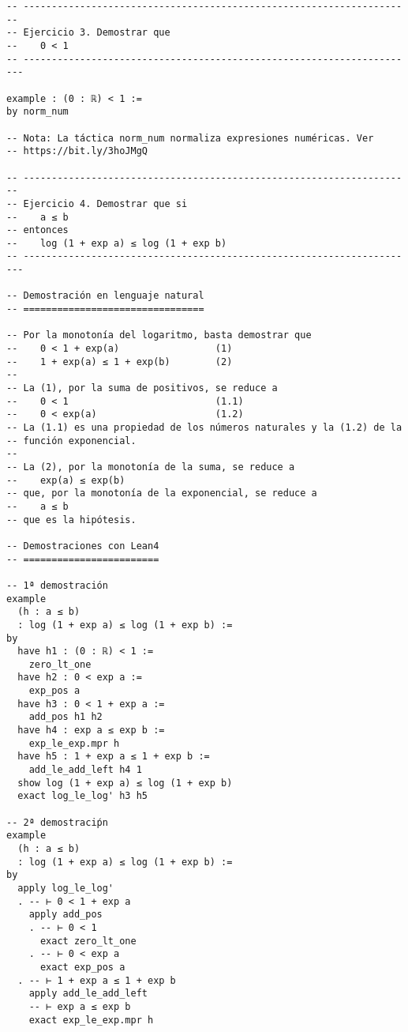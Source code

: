 \begin{verbatim}
-- ---------------------------------------------------------------------
-- Ejercicio 3. Demostrar que
--    0 < 1
-- ----------------------------------------------------------------------

example : (0 : ℝ) < 1 :=
by norm_num

-- Nota: La táctica norm_num normaliza expresiones numéricas. Ver
-- https://bit.ly/3hoJMgQ

-- ---------------------------------------------------------------------
-- Ejercicio 4. Demostrar que si
--    a ≤ b
-- entonces
--    log (1 + exp a) ≤ log (1 + exp b)
-- ----------------------------------------------------------------------

-- Demostración en lenguaje natural
-- ================================

-- Por la monotonía del logaritmo, basta demostrar que
--    0 < 1 + exp(a)                 (1)
--    1 + exp(a) ≤ 1 + exp(b)        (2)
--
-- La (1), por la suma de positivos, se reduce a
--    0 < 1                          (1.1)
--    0 < exp(a)                     (1.2)
-- La (1.1) es una propiedad de los números naturales y la (1.2) de la
-- función exponencial.
--
-- La (2), por la monotonía de la suma, se reduce a
--    exp(a) ≤ exp(b)
-- que, por la monotonía de la exponencial, se reduce a
--    a ≤ b
-- que es la hipótesis.

-- Demostraciones con Lean4
-- ========================

-- 1ª demostración
example
  (h : a ≤ b)
  : log (1 + exp a) ≤ log (1 + exp b) :=
by
  have h1 : (0 : ℝ) < 1 :=
    zero_lt_one
  have h2 : 0 < exp a :=
    exp_pos a
  have h3 : 0 < 1 + exp a :=
    add_pos h1 h2
  have h4 : exp a ≤ exp b :=
    exp_le_exp.mpr h
  have h5 : 1 + exp a ≤ 1 + exp b :=
    add_le_add_left h4 1
  show log (1 + exp a) ≤ log (1 + exp b)
  exact log_le_log' h3 h5

-- 2ª demostraciṕn
example
  (h : a ≤ b)
  : log (1 + exp a) ≤ log (1 + exp b) :=
by
  apply log_le_log'
  . -- ⊢ 0 < 1 + exp a
    apply add_pos
    . -- ⊢ 0 < 1
      exact zero_lt_one
    . -- ⊢ 0 < exp a
      exact exp_pos a
  . -- ⊢ 1 + exp a ≤ 1 + exp b
    apply add_le_add_left
    -- ⊢ exp a ≤ exp b
    exact exp_le_exp.mpr h
\end{verbatim}

